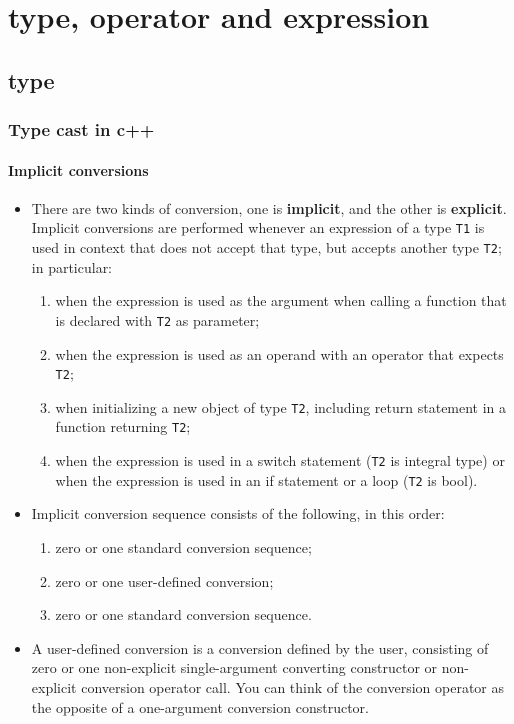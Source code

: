 \documentclass[a4paper,11pt,twoside]{book}
\begin{document}
\chapter{type, operator and expression}
\section{type}
\subsection{Type cast in c++}
\subsubsection{Implicit conversions}
\begin{itemize}
\item There are two kinds of conversion, one is \textbf{implicit}, and the other is \textbf{explicit}. Implicit conversions are performed whenever an expression of a type \texttt{T1} is used in context that does not accept that type, but accepts another type \texttt{T2}; in particular:
	\begin{enumerate}
		\item when the expression is used as the argument when calling a function that is declared with \texttt{T2} as parameter;
		\item when the expression is used as an operand with an operator that expects \texttt{T2};
		\item when initializing a new object of type \texttt{T2}, including return statement in a function returning \texttt{T2};
		\item when the expression is used in a switch statement (\texttt{T2} is integral type) or when the expression is used in an if statement or a loop (\texttt{T2} is bool).
	\end{enumerate}
	
	\item Implicit conversion sequence consists of the following, in this order:
	\begin{enumerate}
		\item zero or one standard conversion sequence;
		\item zero or one user-defined conversion;
		\item zero or one standard conversion sequence.
	\end{enumerate}

	\item A user-defined conversion is a conversion defined by the user, consisting of zero or one non-explicit single-argument converting constructor or non-explicit conversion operator call. You can think of the conversion operator as the opposite of a one-argument conversion constructor.


\end{itemize}
\end{document}
